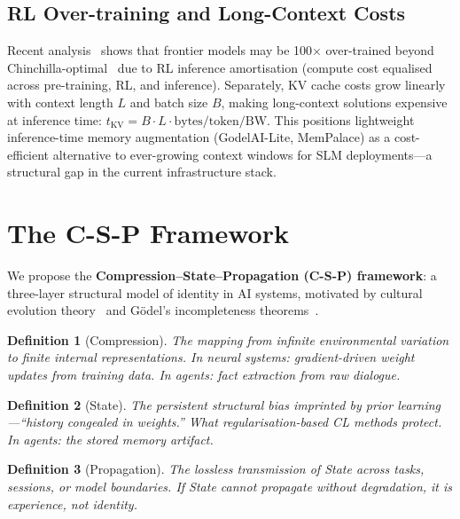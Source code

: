 \documentclass[12pt]{article}
\newtheorem{definition}{Definition}[section]
\begin{document}
\subsection{RL Over-training and Long-Context Costs}

Recent analysis~\citep{reinerpope2026} shows that frontier models may be
100$\times$ over-trained beyond Chinchilla-optimal~\citep{hoffmann2022training}
due to RL inference amortisation (compute cost equalised across pre-training,
RL, and inference). Separately, KV cache costs grow linearly with context
length $L$ and batch size $B$, making long-context solutions expensive at
inference time: $t_{\mathrm{KV}} = B \cdot L \cdot \mathrm{bytes/token} / \mathrm{BW}$.
This positions lightweight inference-time memory augmentation (GodelAI-Lite,
MemPalace) as a cost-efficient alternative to ever-growing context windows for
SLM deployments---a structural gap in the current infrastructure stack.

\section{The C-S-P Framework}
\label{sec:csp}

We propose the \textbf{Compression--State--Propagation (C-S-P) framework}:
a three-layer structural model of identity in AI systems, motivated by
cultural evolution theory~\citep{boyd1985culture} and G\"{o}del's
incompleteness theorems~\citep{godel1931}.

\begin{definition}[Compression]
  The mapping from infinite environmental variation to finite internal
  representations. In neural systems: gradient-driven weight updates from
  training data. In agents: fact extraction from raw dialogue.
\end{definition}

\begin{definition}[State]
  The persistent structural bias imprinted by prior learning---``history
  congealed in weights.'' What regularisation-based CL methods protect.
  In agents: the stored memory artifact.
\end{definition}

\begin{definition}[Propagation]
  The lossless transmission of State across tasks, sessions, or model
  boundaries. If State cannot propagate without degradation, it is
  experience, not identity.
\end{definition}
\end{document}
